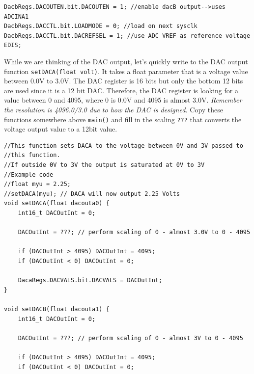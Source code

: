 \documentclass[11pt]{article}
\begin{document}
\begin{enumerate}
\begin{verbatim}
DacbRegs.DACOUTEN.bit.DACOUTEN = 1; //enable dacB output-->uses ADCINA1
DacbRegs.DACCTL.bit.LOADMODE = 0; //load on next sysclk
DacbRegs.DACCTL.bit.DACREFSEL = 1; //use ADC VREF as reference voltage
EDIS;
\end{verbatim}
        While we are thinking of the DAC output, let’s quickly write to the DAC output function \texttt{setDACA(float volt)}. It takes a float parameter that is a voltage value between 0.0V to 3.0V. The DAC register is 16 bits but only the bottom 12 bits are used since it is a 12 bit DAC. Therefore, the DAC register is looking for a value between 0 and 4095, where 0 is 0.0V and 4095 is almost 3.0V. \textit{Remember the resolution is 4096.0/3.0 due to how the DAC is designed.} Copy these functions somewhere above \texttt{main()} and fill in the scaling \texttt{???} that converts the voltage output value to a 12bit value.
\begin{verbatim}
//This function sets DACA to the voltage between 0V and 3V passed to
//this function.
//If outside 0V to 3V the output is saturated at 0V to 3V
//Example code
//float myu = 2.25;
//setDACA(myu); // DACA will now output 2.25 Volts
void setDACA(float dacouta0) {
    int16_t DACOutInt = 0;

    DACOutInt = ???; // perform scaling of 0 - almost 3.0V to 0 - 4095

    if (DACOutInt > 4095) DACOutInt = 4095;
    if (DACOutInt < 0) DACOutInt = 0;

    DacaRegs.DACVALS.bit.DACVALS = DACOutInt;
}

void setDACB(float dacouta1) {
    int16_t DACOutInt = 0;

    DACOutInt = ???; // perform scaling of 0 - almost 3V to 0 - 4095

    if (DACOutInt > 4095) DACOutInt = 4095;
    if (DACOutInt < 0) DACOutInt = 0;


\end{verbatim}
\end{enumerate}
\end{document}
